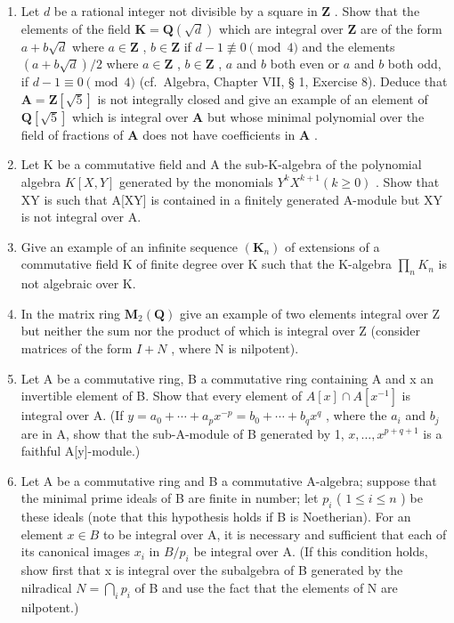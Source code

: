 
\begin{enumerate}
\def\labelenumi{\arabic{enumi}.}
\item
  Let \(d\) be a rational integer not divisible by a square in \(\mathbf{Z}\) . Show that the elements of the field \(\mathbf{K} = \mathbf{Q}(\sqrt{d})\) which are integral over \(\mathbf{Z}\) are of the form \(a + b\sqrt{d}\) where \(a \in \mathbf{Z}\) , \(b \in \mathbf{Z}\) if \(d - 1 \not\equiv 0 \pmod{4}\) and the elements \((a + b\sqrt{d})/2\) where \(a \in \mathbf{Z}\) , \(b \in \mathbf{Z}\) , \(a\) and \(b\) both even or \(a\) and \(b\) both odd, if \(d - 1 \equiv 0 \pmod{4}\) (cf.~Algebra, Chapter VII, § 1, Exercise 8). Deduce that \(\mathbf{A} = \mathbf{Z}[\sqrt{5}]\) is not integrally closed and give an example of an element of \(\mathbf{Q}[\sqrt{5}]\) which is integral over \(\mathbf{A}\) but whose minimal polynomial over the field of fractions of \(\mathbf{A}\) does not have coefficients in \(\mathbf{A}\) .
\item
  Let K be a commutative field and A the sub-K-algebra of the polynomial algebra \(K[X, Y]\) generated by the monomials \(Y^{k}X^{k+1} (k \geqslant 0)\) . Show that XY is such that A{[}XY{]} is contained in a finitely generated A-module but XY is not integral over A.
\item
  Give an example of an infinite sequence \((\mathbf{K}_{n})\) of extensions of a commutative field K of finite degree over K such that the K-algebra \(\prod_{n} K_{n}\) is not algebraic over K.
\item
  In the matrix ring \(\mathbf{M}_{2}(\mathbf{Q})\) give an example of two elements integral over Z but neither the sum nor the product of which is integral over Z (consider matrices of the form \(I + N\) , where N is nilpotent).
\item
  Let A be a commutative ring, B a commutative ring containing A and x an invertible element of B. Show that every element of \(A[x] \cap A[x^{-1}]\) is integral over A. (If \(y = a_{0} + \cdots + a_{p}x^{-p} = b_{0} + \cdots + b_{q}x^{q}\) , where the \(a_{i}\) and \(b_{j}\) are in A, show that the sub-A-module of B generated by 1, \(x, \ldots, x^{p+q+1}\) is a faithful A{[}y{]}-module.)
\item
  Let A be a commutative ring and B a commutative A-algebra; suppose that the minimal prime ideals of B are finite in number; let \(p_{i}\) ( \(1 \leqslant i \leqslant n\) ) be these ideals (note that this hypothesis holds if B is Noetherian). For an element \(x \in B\) to be integral over A, it is necessary and sufficient that each of its canonical images \(x_{i}\) in \(B/p_{i}\) be integral over A. (If this condition holds, show first that x is integral over the subalgebra of B generated by the nilradical \(N = \bigcap_{i} p_{i}\) of B and use the fact that the elements of N are nilpotent.)

\end{enumerate}

